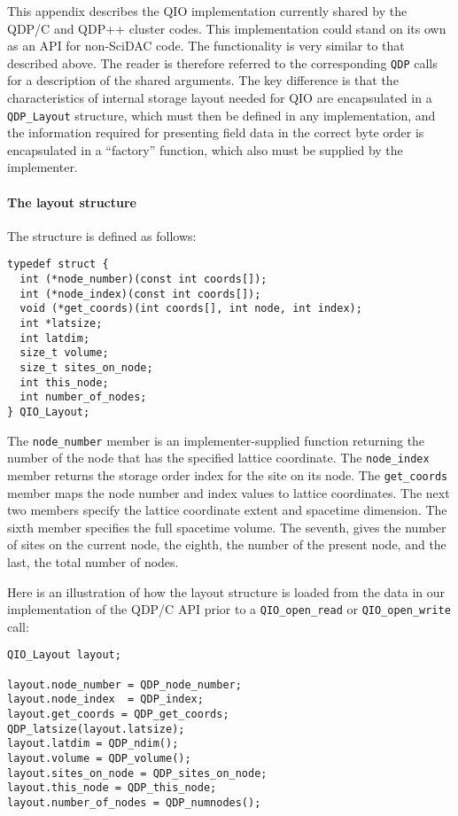 \documentclass{article}
\begin{document}
This appendix describes the QIO implementation currently shared by the
QDP/C and QDP++ cluster codes.  This implementation could stand on its
own as an API for non-SciDAC code.  The functionality is very similar
to that described above.  The reader is therefore referred to the
corresponding \verb|QDP| calls for a description of the shared
arguments.  The key difference is that the characteristics of internal
storage layout needed for QIO are encapsulated in a \verb|QDP_Layout|
structure, which must then be defined in any implementation, and the
information required for presenting field data in the correct byte
order is encapsulated in a ``factory'' function, which also must be
supplied by the implementer.

\paragraph{The layout structure}

The structure is defined as follows:
\begin{verbatim}
typedef struct {
  int (*node_number)(const int coords[]);
  int (*node_index)(const int coords[]);
  void (*get_coords)(int coords[], int node, int index);
  int *latsize;
  int latdim;
  size_t volume;
  size_t sites_on_node;
  int this_node;
  int number_of_nodes;
} QIO_Layout;
\end{verbatim}
%
The \verb|node_number| member is an implementer-supplied function
returning the number of the node that has the specified lattice
coordinate.  The \verb|node_index| member returns the storage order
index for the site on its node.  The \verb|get_coords| member maps the
node number and index values to lattice coordinates. The next two
members specify the lattice coordinate extent and spacetime dimension.
The sixth member specifies the full spacetime volume.  The seventh,
gives the number of sites on the current node, the eighth, the number
of the present node, and the last, the total number of nodes.

Here is an illustration of how the layout structure is loaded from the
data in our implementation of the QDP/C API prior to a
\verb|QIO_open_read| or \verb|QIO_open_write| call:
%
\begin{verbatim}
QIO_Layout layout;

layout.node_number = QDP_node_number;
layout.node_index  = QDP_index;
layout.get_coords = QDP_get_coords;
QDP_latsize(layout.latsize);
layout.latdim = QDP_ndim();
layout.volume = QDP_volume();
layout.sites_on_node = QDP_sites_on_node;
layout.this_node = QDP_this_node;
layout.number_of_nodes = QDP_numnodes();
\end{verbatim}
\end{document}
